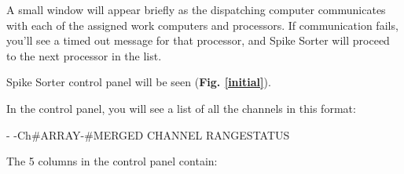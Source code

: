 \documentclass[12pt]{article}
\begin{document}
A small window will appear briefly as the dispatching computer
communicates with each of the assigned work computers and
processors. If communication fails, you'll see a {\sf timed out}
message for that processor, and Spike Sorter will proceed to the next
processor in the list.

Spike Sorter control panel will be seen (\textbf{Fig. \ref{initial}}).


\bigskip

\begin{center}
\label{initial}
\end{center}

In the control panel, you will see a list of all the channels in this
format:

{\centering
- -\hfill Ch\#\hfill ARRAY-\#\hfill MERGED CHANNEL RANGE\hfill STATUS
\par}

The 5 columns in the control panel contain:
\end{document}
